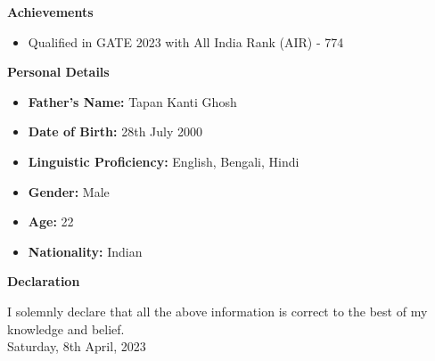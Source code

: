 \documentclass[a4paper,10pt]{article}
\newcommand{\resitem}[1]{\item #1}
\newcommand{\resheading}[1]{\vspace{0.5em} {\small \colorbox{mygrey}{{\begin{minipage}{0.975\textwidth}{{\textbf{#1}}}\end{minipage}}}} \vspace{0.5em}}
\begin{document}
\resheading{Achievements}
\begin{itemize}[noitemsep,topsep=0pt]
\resitem{Qualified in GATE 2023 with All India Rank (AIR) - 774}
\end{itemize}

\resheading{Personal Details}
\begin{itemize}[noitemsep,topsep=0pt]
\resitem{\textbf{Father's Name:} Tapan Kanti Ghosh}
\resitem{\textbf{Date of Birth:} 28th July 2000}
\resitem{\textbf{Linguistic Proficiency:} English, Bengali, Hindi}
\resitem{\textbf{Gender:} Male}
\resitem{\textbf{Age:} 22}
\resitem{\textbf{Nationality:} Indian}
\end{itemize}

\resheading{Declaration}
I solemnly declare that all the above information is correct to the best of my knowledge and belief. \\
Saturday, 8th April, 2023
\end{document}
